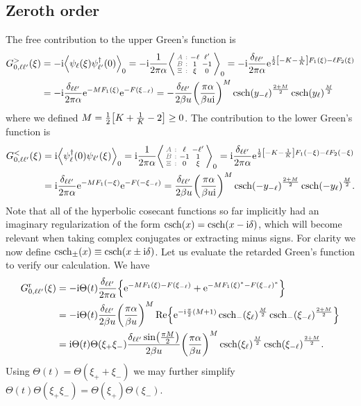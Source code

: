\documentclass[english, parskip=full]{scrartcl}
\begin{document}
\subsection{Zeroth order}
The free contribution to the upper Green's function is
\begin{align}
G_{0,\ell\ell'}^>(\xi) &= -\i\bra*{\psi_\ell(\xi) \psi_{\ell'}^\dagger(0)}_0 = -\i \frac{1}{2\pi\alpha} \bra*{\cabx{-\ell&\ell'}{1&-1}{\xi&0}}_0 = -\i \frac{\delta_{\ell\ell'}}{2\pi\alpha} \powe{\frac{1}{2} \klb*{-K - \frac{1}{K}}F_1(\xi) - \ell F_2(\xi)}\\
&= -\i \frac{\delta_{\ell\ell'}}{2\pi\alpha} \powe{-MF_1(\xi)} \powe{-F(\xi_{-\ell})} = -\frac{\delta_{\ell\ell'}}{2\beta u} \kla*{\frac{\pi\alpha}{\beta u\i}}^M \csch(y_{-\ell})^\frac{2+M}{2} \csch(y_\ell)^\frac{M}{2}
\end{align}
where we defined $M = \frac{1}{2} \klb*{K + \frac{1}{K} - 2}\ge 0$.
The contribution to the lower Green's function is
\begin{align}
G_{0,\ell\ell'}^<(\xi) &= \i\bra*{\psi_{\ell}^\dagger(0) \psi_{\ell'}(\xi)}_0 = \i \frac{1}{2\pi\alpha} \bra*{\cabx{\ell&-\ell'}{-1&1}{0&\xi}}_0 = \i \frac{\delta_{\ell\ell'}}{2\pi\alpha} \powe{\frac{1}{2} \klb*{-K - \frac{1}{K}}F_1(-\xi) - \ell F_2(-\xi)}\\
&= \i \frac{\delta_{\ell\ell'}}{2\pi\alpha} \powe{-MF_1(-\xi)} \powe{-F(-\xi_{-\ell})} = \frac{\delta_{\ell\ell'}}{2\beta u} \kla*{\frac{\pi\alpha}{\beta u\i}}^M \csch(-y_{-\ell})^\frac{2+M}{2} \csch(-y_\ell)^\frac{M}{2}.
\end{align}
Note that all of the hyperbolic cosecant functions so far implicitly had an imaginary regularization of the form $\csch(x) = \csch(x-\i\delta)$, which will become relevant when taking complex conjugates or extracting minus signs.
For clarity we now define $\csch_\pm(x) \equiv \csch(x\pm \i\delta)$.
Let us evaluate the retarded Green's function to verify our calculation.
We have
\begin{align}
G_{0,\ell\ell'}^\r(\xi) &= -\i\Theta(t) \frac{\delta_{\ell\ell'}}{2\pi\alpha}\klc*{\powe{-MF_1(\xi) - F(\xi_{-\ell})} + \powe{-MF_1(\xi)^\ast - F(\xi_{-\ell})^\ast}}\\
&= -\i\Theta(t) \frac{\delta_{\ell\ell'}}{2\beta u} \kla*{\frac{\pi\alpha}{\beta u}}^M \Re \klc*{\powe{-\i\frac{\pi}{2} (M+1)} \csch_-(\xi_\ell)^\frac{M}{2} \csch_-(\xi_{-\ell})^\frac{2+M}{2}}\\
&= \i\Theta(t) \Theta(\xi_+\xi_-) \frac{\delta_{\ell\ell'} \sin\kla*{\frac{\pi M}{2}}}{2\beta u} \kla*{\frac{\pi\alpha}{\beta u}}^M \csch(\xi_\ell)^\frac{M}{2} \csch(\xi_{-\ell})^\frac{2+M}{2}.
\end{align}
Using $\Theta(t) = \Theta(\xi_++\xi_-)$ we may further simplify $\Theta(t) \Theta(\xi_+\xi_-) = \Theta(\xi_+)\Theta(\xi_-)$.
\end{document}
